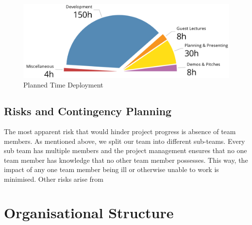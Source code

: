 \documentclass[a4paper,10pt,DIV10,openright,openbib]{scrreprt}
\begin{document}
\begin{figure}[h]
  \centring
  \includegraphics[width=\textwidth]{pie.png}
  \caption{Planned Time Deployment}
\end{figure}

\section{Risks and Contingency Planning}
The most apparent risk that would hinder project progress is absence of team members. 
As mentioned above, %
we split our team into different sub-teams. Every sub team has multiple members and 
the project management ensures that no one team member has knowledge that no other 
team member possesses. This way, the impact of any one team member being ill or 
otherwise unable to work is minimised. Other risks arise from 



{\let\clearpage\relax \chapter{Organisational Structure}}
\end{document}
